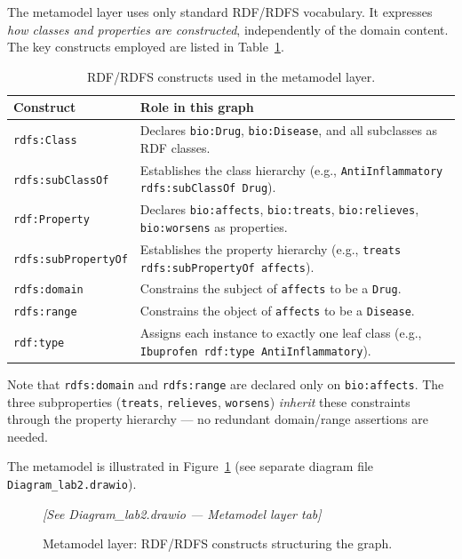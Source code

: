 \documentclass[11pt,a4paper]{article}
\begin{document}
The metamodel layer uses only standard RDF/RDFS vocabulary.  It expresses
\emph{how classes and properties are constructed}, independently of the domain
content.  The key constructs employed are listed in
Table~\ref{tab:metamodel}.

\begin{table}[h!]
\centering
\caption{RDF/RDFS constructs used in the metamodel layer.}
\label{tab:metamodel}
\begin{tabular}{@{}lp{9cm}@{}}
\toprule
\textbf{Construct} & \textbf{Role in this graph} \\
\midrule
\texttt{rdfs:Class}           & Declares \texttt{bio:Drug}, \texttt{bio:Disease}, and all subclasses as RDF classes. \\
\texttt{rdfs:subClassOf}      & Establishes the class hierarchy (e.g., \texttt{AntiInflammatory rdfs:subClassOf Drug}). \\
\texttt{rdf:Property}         & Declares \texttt{bio:affects}, \texttt{bio:treats}, \texttt{bio:relieves}, \texttt{bio:worsens} as properties. \\
\texttt{rdfs:subPropertyOf}   & Establishes the property hierarchy (e.g., \texttt{treats rdfs:subPropertyOf affects}). \\
\texttt{rdfs:domain}          & Constrains the subject of \texttt{affects} to be a \texttt{Drug}. \\
\texttt{rdfs:range}           & Constrains the object of \texttt{affects} to be a \texttt{Disease}. \\
\texttt{rdf:type}             & Assigns each instance to exactly one leaf class (e.g., \texttt{Ibuprofen rdf:type AntiInflammatory}). \\
\bottomrule
\end{tabular}
\end{table}

\noindent Note that \texttt{rdfs:domain} and \texttt{rdfs:range} are declared
only on \texttt{bio:affects}.  The three subproperties (\texttt{treats},
\texttt{relieves}, \texttt{worsens}) \emph{inherit} these constraints through
the property hierarchy — no redundant domain/range assertions are needed.

The metamodel is illustrated in Figure~\ref{fig:metamodel} (see separate diagram
file \texttt{Diagram\_lab2.drawio}).

\begin{figure}[h!]
  \centering
  \textit{[See Diagram\_lab2.drawio — Metamodel layer tab]}
  \caption{Metamodel layer: RDF/RDFS constructs structuring the graph.}
  \label{fig:metamodel}
\end{figure}
\end{document}

